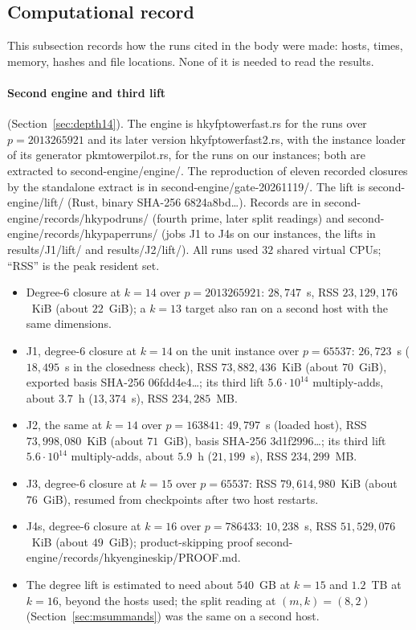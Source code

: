 \documentclass[11pt]{article}
\theoremstyle{definition}\newtheorem{definition}[theorem]{Definition}
\theoremstyle{remark}\newtheorem{remark}[theorem]{Remark}
\newcommand{\codeus}{\textunderscore\allowbreak}
\newcommand{\code}[1]{{\ttfamily\let\_\codeus#1}}
\begin{document}
\subsection{Computational record}\label{app:record}
This subsection records how the runs cited in the body were made: hosts,
times, memory, hashes and file locations. None of it is needed to read the
results.

\paragraph{Second engine and third lift} (Section~\ref{sec:depth14}). The
engine is \code{hky\_fp\_tower\_fast.rs} for the runs over $p=2013265921$
and its later version \code{hky\_fp\_tower\_fast2.rs}, with the instance
loader of its generator \code{pkm\_tower\_pilot.rs}, for the runs on our
instances; both are extracted to \code{second-engine/\allowbreak{}engine/}.
The reproduction of eleven recorded closures by the standalone extract is
in \code{second-engine/\allowbreak{}gate-20261119/}. The lift is
\code{second-engine/\allowbreak{}lift/} (Rust, binary SHA-256
\code{6824a8bd\ldots}). Records are in
\code{second-engine/\allowbreak{}records/\allowbreak{}hky\_pod\_runs\_20261117/}
(fourth prime, later split readings) and
\code{second-engine/\allowbreak{}records/\allowbreak{}hky\_paper\_runs\_20261118/}
(jobs J1 to J4s on our instances, the lifts in \code{results/\allowbreak{}J1/\allowbreak{}lift/}
and \code{results/\allowbreak{}J2/\allowbreak{}lift/}).
All runs used $32$ shared virtual CPUs; ``RSS'' is the peak resident set.
\begin{itemize}
\item Degree-$6$ closure at $k=14$ over $p=2013265921$: $28{,}747$~s, RSS
 $23{,}129{,}176$~KiB (about $22$~GiB); a $k=13$ target also ran on a second
 host with the same dimensions.
\item J1, degree-$6$ closure at $k=14$ on the unit instance over $p=65537$:
 $26{,}723$~s ($18{,}495$~s in the closedness check), RSS
 $73{,}882{,}436$~KiB (about $70$~GiB), exported basis SHA-256
 \code{06fdd4e4\ldots}; its third lift $5.6\cdot10^{14}$ multiply-adds,
 about $3.7$~h ($13{,}374$~s), RSS $234{,}285$~MB.
\item J2, the same at $k=14$ over $p=163841$: $49{,}797$~s (loaded host), RSS
 $73{,}998{,}080$~KiB (about $71$~GiB), basis SHA-256 \code{3d1f2996\ldots};
 its third lift $5.6\cdot10^{14}$ multiply-adds, about $5.9$~h
 ($21{,}199$~s), RSS $234{,}299$~MB.
\item J3, degree-$6$ closure at $k=15$ over $p=65537$: RSS
 $79{,}614{,}980$~KiB (about $76$~GiB), resumed from checkpoints after two
 host restarts.
\item J4s, degree-$6$ closure at $k=16$ over $p=786433$: $10{,}238$~s, RSS
 $51{,}529{,}076$~KiB (about $49$~GiB); product-skipping proof
 \code{second-engine/\allowbreak{}records/\allowbreak{}hky\_engine\_skip\_20261118/\allowbreak{}PROOF.md}.
\item The degree lift is estimated to need about $540$~GB at $k=15$ and
 $1.2$~TB at $k=16$, beyond the hosts used; the split reading at
 $(m,k)=(8,2)$ (Section~\ref{sec:msummands}) was the same on a second host.
\end{itemize}
\end{document}
